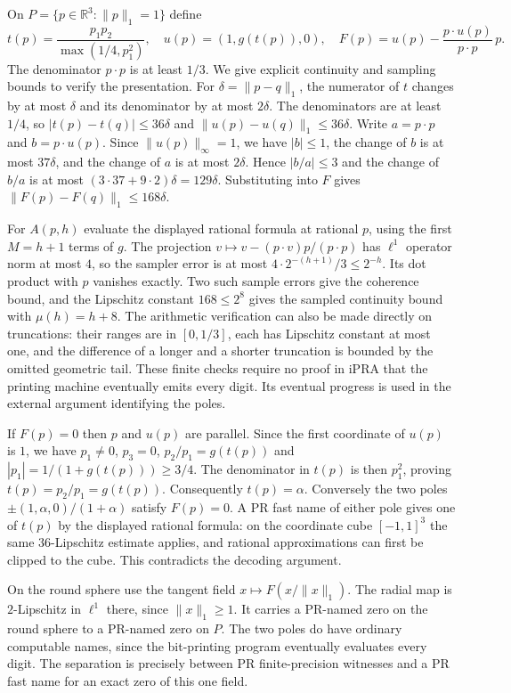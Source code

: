 On $P=\{p\in\mathbb R^3:\|p\|_1=1\}$ define
\[
 t(p)=\frac{p_1p_2}{\max(1/4,p_1^2)},\quad
 u(p)=(1,g(t(p)),0),\quad
 F(p)=u(p)-\frac{p\cdot u(p)}{p\cdot p}\,p .
\]
The denominator $p\cdot p$ is at least $1/3$. We give explicit
continuity and sampling bounds to verify the presentation.
For $\delta=\|p-q\|_1$, the numerator of $t$ changes by at most
$\delta$ and its denominator by at most $2\delta$. The denominators
are at least $1/4$, so $|t(p)-t(q)|\leq36\delta$ and
$\|u(p)-u(q)\|_1\leq36\delta$. Write $a=p\cdot p$ and
$b=p\cdot u(p)$. Since $\|u(p)\|_\infty=1$, we have $|b|\leq1$,
the change of $b$ is at most $37\delta$, and the change of $a$ is
at most $2\delta$. Hence $|b/a|\leq3$ and the change of $b/a$ is
at most $(3\cdot37+9\cdot2)\delta=129\delta$. Substituting into
$F$ gives $\|F(p)-F(q)\|_1\leq168\delta$.

For $A(p,h)$ evaluate the displayed rational formula at rational
$p$, using the first $M=h+1$ terms of $g$. The projection
$v\mapsto v-(p\cdot v)p/(p\cdot p)$ has $\ell^1$ operator norm
at most $4$, so the sampler error is at most $4\cdot2^{-(h+1)}/3
\leq 2^{-h}$. Its dot product with $p$ vanishes exactly. Two such
sample errors give the coherence bound, and the Lipschitz constant
$168\leq 2^8$ gives the sampled continuity bound with $\mu(h)=h+8$.
The arithmetic verification can also be made directly on truncations:
their ranges are in $[0,1/3]$, each has Lipschitz constant at most one,
and the difference of a longer and a shorter truncation is bounded by
the omitted geometric tail. These finite checks require no proof in
iPRA that the printing machine eventually emits every digit. Its
eventual progress is used in the external argument identifying the poles.

If $F(p)=0$ then $p$ and $u(p)$ are parallel. Since the first
coordinate of $u(p)$ is $1$, we have $p_1\ne0$,
$p_3=0$, $p_2/p_1=g(t(p))$ and $|p_1|=1/(1+g(t(p)))\geq3/4$.
The denominator in $t(p)$ is then $p_1^2$, proving
$t(p)=p_2/p_1=g(t(p))$. Consequently $t(p)=\alpha$.
Conversely the two poles
$\pm(1,\alpha,0)/(1+\alpha)$ satisfy $F(p)=0$.
A PR fast name of either pole gives one of $t(p)$ by the displayed
rational formula: on the coordinate cube $[-1,1]^3$ the same
$36$-Lipschitz estimate applies, and rational approximations can first
be clipped to the cube. This contradicts the decoding argument.

On the round sphere use the tangent field $x\mapsto F(x/\|x\|_1)$.
The radial map is $2$-Lipschitz in $\ell^1$ there, since
$\|x\|_1\geq1$. It carries a PR-named zero on the round sphere to a
PR-named zero on $P$. The two poles do have ordinary computable names,
since the bit-printing program eventually evaluates every digit.
The separation is precisely between PR finite-precision witnesses
and a PR fast name for an exact zero of this one field.
